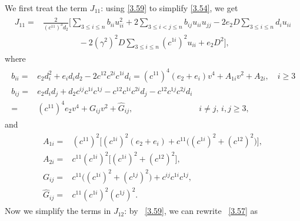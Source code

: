 \documentclass[11pt]{amsart}
\numberwithin{equation}{section}
\begin{document}
We first treat the term $J_{11}$:
using \eqref{3.59} to simplify \eqref{3.54}, we get
\begin{align}\label{3.60}
\begin{split}
J_{11}=&\frac{2}{(c^{11})^3d_2}\big[\sum_{3\leq i\leq n}b_{ii}u_{ii}^2+2\sum_{3\leq i< j\leq n}b_{ij}u_{ii}u_{jj}
-2e_2D\sum_{3\leq i\leq n}d_{i}u_{ii}\\&\qquad\qquad\,\,-2(\gamma^2)^2D\sum_{3\leq i\leq n}(c^{1i})^2u_{ii}+e_2D^2\big],
\end{split}
\end{align}
where
\begin{align}\label{3.61a}
\begin{split}
b_{ii}=&e_2d_i^2+e_id_id_2-2c^{12}c^{2i}c^{1i}d_i
=(c^{11})^4(e_2+e_i)v^4+A_{1i}v^2+A_{2i},\quad i\geq 3\\
b_{ij}=&e_2d_id_j+d_2c^{ij}c^{1i}c^{1j}-c^{12}c^{1i}c^{2i}d_j-c^{12}c^{1j}c^{2j}d_i\\
=&(c^{11})^4e_2v^4+G_{ij}v^2+\hat{G}_{ij},
\qquad\qquad\qquad\qquad i\neq j,\,i,j\geq 3,
\end{split}
\end{align}
and
\begin{align}\label{3.61b}
\begin{split}
A_{1i}=&(c^{11})^2\big[(c^{1i})^2(e_2+e_i)+c^{11}\big((c^{1i})^2+(c^{12})^2\big)\big], \\
A_{2i}=&c^{11}(c^{1i})^2\big[(c^{1i})^2+(c^{12})^2\big], \\
G_{ij}=&c^{11}\big((c^{1i})^2+(c^{1j})^2\big)+c^{ij}c^{1i}c^{1j}, \\
\hat{G}_{ij}=&c^{11}(c^{1i})^2(c^{1j})^2.
\end{split}
\end{align}
Now we simplify the terms in $J_{12}$: by  ~\eqref{3.59},  we can rewrite ~\eqref{3.57} as
\end{document}
